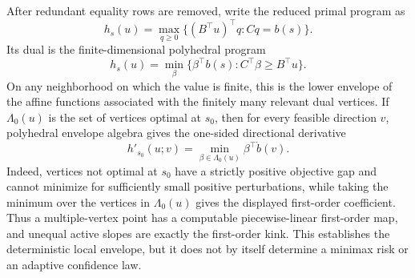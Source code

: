 After redundant equality rows are removed, write the reduced primal program as
\[
h_s(u)=\max_{q\ge0}\{(B^\top u)^\top q:Cq=b(s)\}.
\]
Its dual is the finite-dimensional polyhedral program
\[
h_s(u)=\min_{\beta}\{\beta^\top b(s):C^\top\beta\ge B^\top u\}.
\]
On any neighborhood on which the value is finite, this is the lower envelope of the affine functions associated with the finitely many relevant dual vertices.  If \(\Lambda_0(u)\) is the set of vertices optimal at \(s_0\), then for every feasible direction \(v\), polyhedral envelope algebra gives the one-sided directional derivative
\[
h'_{s_0}(u;v)=\min_{\beta\in\Lambda_0(u)}\beta^\top \dot b(v).
\]
Indeed, vertices not optimal at \(s_0\) have a strictly positive objective gap and cannot minimize for sufficiently small positive perturbations, while taking the minimum over the vertices in \(\Lambda_0(u)\) gives the displayed first-order coefficient.  Thus a multiple-vertex point has a computable piecewise-linear first-order map, and unequal active slopes are exactly the first-order kink.  This establishes the deterministic local envelope, but it does not by itself determine a minimax risk or an adaptive confidence law.
